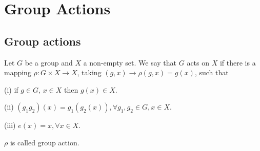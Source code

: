 







\section{Group Actions}

\subsection{Group actions}


\begin{definition}\label{def:group_action}
Let $G$ be a group and $X$ a non-empty set. We say that $G$ acts on $X$ if there is a mapping $\rho:G\times X \to X$, taking $(g,x) \to \rho(g,x) = g(x)$, such that
\ben
\item [(i)] if $g\in G$, $x\in X$ then $g(x)\in X$.
\item [(ii)] $(g_1g_2)(x) = g_1(g_2(x)),\forall g_1,g_2 \in G,x\in X$.
\item [(iii)] $e(x) =x, \forall x\in X$.
\een

$\rho$ is called group action.
\end{definition}


